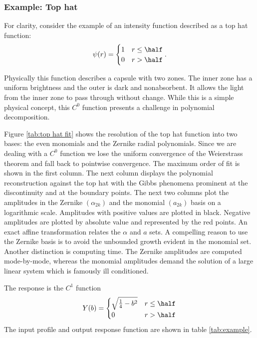 \documentclass[final,leqno,onefignum,onetabnum]{siamltex1213}
\begin{document}
\subsubsection{Example: Top hat}
For clarity, consider the example of an intensity function described as a top hat function:
  \begin{equation}
    \psi(r) = 
    \begin{cases}
      1 & r \le \half \\
      0 & r > \half
    \end{cases}.
    \label{eq:psi}
  \end{equation}

Physically this function describes a capsule with two zones. The inner zone has a uniform brightness and the outer is dark and nonabsorbent. It allows the light from the inner zone to pass through without change. While this is a simple physical concept, this $C^{0}$ function presents a challenge in polynomial decomposition.  

Figure \ref{tab:top hat fit} shows the resolution of the top hat function into two bases: the even monomials and the Zernike radial polynomials. Since we are dealing with a $C^{0}$ function we lose the uniform convergence of the Weierstrass theorem and fall back to pointwise convergence. The maximum order of fit is shown in the first column. The next column displays the polynomial reconstruction against the top hat with the Gibbs phenomena prominent at the discontinuity and at the boundary points. The next two columns plot the amplitudes in the Zernike $(\alpha_{2k})$ and the monomial $(a_{2k})$ basis on a logarithmic scale. Amplitudes with positive values are plotted in black. Negative amplitudes are plotted by absolute value and represented by the red points. An exact affine transformation relates the $\alpha$ and $a$ sets. A compelling reason to use the Zernike basis is to avoid the unbounded growth evident in the monomial set. Another distinction is computing time. The Zernike amplitudes are computed mode-by-mode, whereas the monomial amplitudes demand the solution of a large linear system which is famously ill conditioned.

	
The response is the $C^{1}$ function
  \begin{equation}
    Y(b) = 
    \begin{cases}
      \sqrt{\frac{1}{4} - b^{2}} & r \le \half \\
      0 & r > \half
    \end{cases}
    \label{eq:Y}
  \end{equation}
The input profile and output response function are shown in table \eqref{tab:example}.
\end{document}
